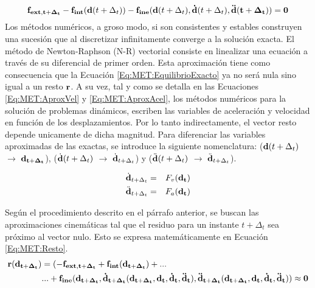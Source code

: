 \begin{equation}\label{Eq:MET:EquilibrioExacto}
	\bf{f}_{ext,t+\Delta_t}-\bf{f}_{int}(\bf{d}\text{$(t+\Delta_t)$})-\bf{f}_{ine}(\bf{d} \text{$(t+\Delta_t)$},\dot{\bf{d}}\text{$(t+\Delta_t)$},\ddot{\bf{d}}(t+\Delta_t))
	=0
\end{equation}
Los métodos numéricos, a groso modo, si son consistentes y estables construyen una sucesión que al discretizar infinitamente converge a la solución exacta. El método de Newton-Raphson (N-R) vectorial consiste en linealizar una ecuación a través de su diferencial de primer orden. Esta aproximación tiene como consecuencia que la Ecuación \eqref{Eq:MET:EquilibrioExacto} ya no será nula sino igual a un resto $\bf{r}$. A su vez, tal y como se detalla en las Ecuaciones \eqref{Eq:MET:AproxVel} y \eqref{Eq:MET:AproxAcel}, los métodos numéricos para la solución de problemas dinámicos, escriben las variables de aceleración y velocidad en función de los desplazamientos. Por lo tanto indirectamente, el vector resto depende unicamente de dicha magnitud. Para diferenciar las variables aproximadas de las exactas, se introduce la siguiente nomenclatura: ($\bf{d}\text{$(t+\Delta_t)$}$ $\rightarrow$ $\bf{d}_{t+\Delta_t}$), ($\dot{\bf{d}}\text{$(t+\Delta_t)$}$ $\rightarrow$ $\dot{\bf{d}}_{t+\Delta_t}$) y ($\ddot{\bf{d}}\text{$(t+\Delta_t)$}$ $\rightarrow$ $\ddot{\bf{d}}_{t+\Delta_t}$). 


\begin{eqnarray}\label{Eq:MET:AproxVel}
\dot{\bf{d}}_{t+\Delta_t}&=&F_v(\bf{d_t})\\
\label{Eq:MET:AproxAcel}
\ddot{\bf{d}}_{t+\Delta_t}&=&F_a(\bf{d_t})
\end{eqnarray}

Según el procedimiento descrito en el párrafo anterior, se buscan las aproximaciones cinemáticas tal que el residuo para un instante $t +\Delta_t$ sea próximo al vector nulo. Esto se expresa matemáticamente en Ecuación \eqref{Eq:MET:Resto}.
\begin{equation}\label{Eq:MET:Resto}
\begin{split}
	\bf{r}(\bf{d}_{t+\Delta_t})&=(-\bf{f}_{ext,t+\Delta_t}+\bf{f}_{int}(\bf{d}_{t+\Delta_t})+...\\	
	&...+\bf{f}_{ine}(\bf{d_{t+\Delta_t}},\dot{\bf{d}}_{t+\Delta_t}(d_{t+\Delta_t},\bf{d_t},\bf{\dot{d}_t},\bf{\ddot{d}_t}),
	\ddot{\bf{d}}_{t+\Delta_t}(d_{t+\Delta_t},\bf{d_t},\bf{\dot{d}_t},\bf{\ddot{d}_t}))
	\approx 0
\end{split}
\end{equation}

